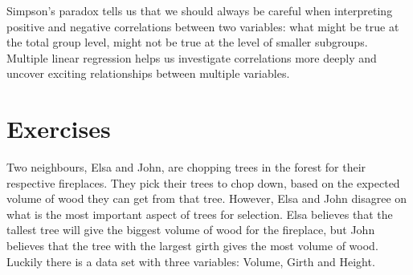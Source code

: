 \documentclass[]{book}\usepackage[]{graphicx}\usepackage[]{color}
\begin{document}
Simpson's paradox tells us that we should always be careful when interpreting positive and negative correlations between two variables: what might be true at the total group level, might not be true at the level of smaller subgroups. Multiple linear regression helps us investigate correlations more deeply and uncover exciting relationships between multiple variables.


\section{Exercises}


Two neighbours, Elsa and John, are chopping trees in the forest for their respective fireplaces. They pick their trees to chop down, based on the expected volume of wood they can get from that tree. However, Elsa and John disagree on what is the most important aspect of trees for selection. Elsa believes that the tallest tree will give the biggest volume of wood for the fireplace, but John believes that the tree with the largest girth gives the most volume of wood. Luckily there is a data set with three variables: Volume, Girth and Height.
\end{document}
